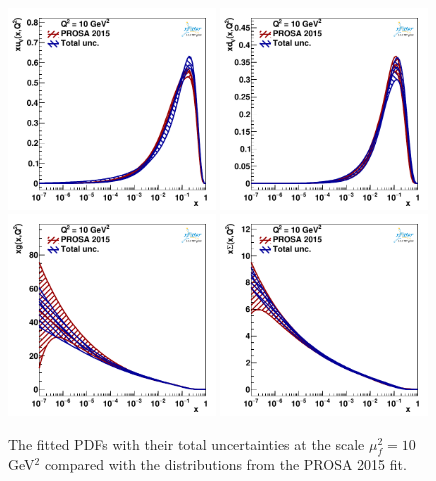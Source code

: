 \documentclass[12pt]{article}
\begin{document}
\begin{figure}
    \centering
    \includegraphics[width=0.49\textwidth]{figs/q2_10_pdf_uv.pdf}
    \includegraphics[width=0.49\textwidth]{figs/q2_10_pdf_dv.pdf}\\
    \includegraphics[width=0.49\textwidth]{figs/q2_10_pdf_g.pdf}
    \includegraphics[width=0.49\textwidth]{figs/q2_10_pdf_Sea.pdf}
    \caption{The fitted PDFs with their total uncertainties at the scale $\mu^2_f=10$ GeV$^2$ compared with the distributions from the PROSA 2015 fit.}
    \label{fig:pdfs}
\end{figure}
\end{document}
